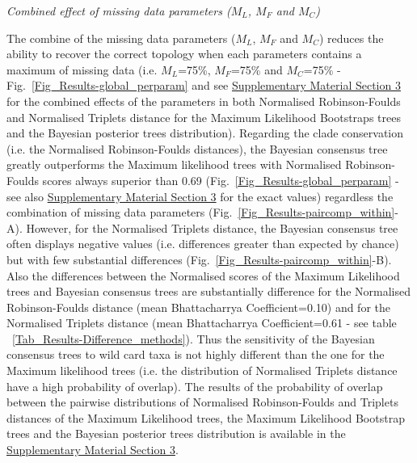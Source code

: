 \documentclass[12pt,letterpaper]{article}
\renewcommand{\subsection}[1]{%
\bigskip
\begin{center}
\begin{large}
\normalfont\itshape #1
\end{large}
\end{center}}
\begin{document}
\subsection{Combined effect of missing data parameters ($M_{L}$, $M_{F}$ and $M_{C}$)} 
The combine of the missing data parameters ($M_{L}$, $M_{F}$ and $M_{C}$) reduces the ability to recover the correct topology when each parameters contains a maximum of missing data (i.e. $M_{L}$=75\%, $M_{F}$=75\% and $M_{C}$=75\% - Fig.~\ref{Fig_Results-global_perparam} and see \hyperref[SupplementaryMaterial]{Supplementary Material Section 3} for the combined effects of the parameters in both Normalised Robinson-Foulds and Normalised Triplets distance for the Maximum Likelihood Bootstraps trees and the Bayesian posterior trees distribution). Regarding the clade conservation (i.e. the Normalised Robinson-Foulds distances), the Bayesian consensus tree greatly outperforms the Maximum likelihood trees with Normalised Robinson-Foulds scores always superior than 0.69 (Fig.~\ref{Fig_Results-global_perparam} - see also \hyperref[SupplementaryMaterial]{Supplementary Material Section 3} for the exact values) regardless the combination of missing data parameters (Fig.~\ref{Fig_Results-paircomp_within}-A). However, for the Normalised Triplets distance, the Bayesian consensus tree often displays negative values (i.e. differences greater than expected by chance) but with few substantial differences (Fig.~\ref{Fig_Results-paircomp_within}-B). Also the differences between the Normalised scores of the Maximum Likelihood trees and Bayesian consensus trees are substantially difference for the Normalised Robinson-Foulds distance (mean Bhattacharrya Coefficient=0.10) and for the Normalised Triplets distance (mean Bhattacharrya Coefficient=0.61 - see table ~\ref{Tab_Results-Difference_methods}). Thus the sensitivity of the Bayesian consensus trees to wild card taxa is not highly different than the one for the Maximum likelihood trees (i.e. the distribution of Normalised Triplets distance have a high probability of overlap). The results of the probability of overlap between the pairwise distributions of Normalised Robinson-Foulds and Triplets distances of the Maximum Likelihood trees, the Maximum Likelihood Bootstrap trees and the Bayesian posterior trees distribution is available in the \hyperref[SupplementaryMaterial]{Supplementary Material Section 3}.


\end{document}
